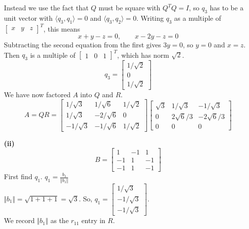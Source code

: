 \documentclass[11pt]{article}
\begin{document}
\noindent Instead we use the fact that $Q$ must be square with $Q^TQ = I$, so $q_3$ has to be a unit vector with $\langle q_3,q_1\rangle = 0$ and $\langle q_3,q_2\rangle = 0$. Writing $q_3$ as a multiple of $\begin{bmatrix} x&y&z \end{bmatrix}^T$, this means
$$
x+y-z=0, \qquad x-2y-z=0
$$
Subtracting the second equation from the first gives $3y=0$, so $y=0$ and $x=z$. Then $q_3$ is a multiple of $\begin{bmatrix} 1&0&1 \end{bmatrix}^T$, which has norm $\sqrt2$.
$$
q_3 = \begin{bmatrix}
    1/\sqrt2\\0\\1/\sqrt2
\end{bmatrix}
$$
We have now factored $A$ into $Q$ and $R$.
$$
A=QR=\begin{bmatrix}
1/\sqrt3 &1/\sqrt6&1/\sqrt2\\
1/\sqrt3 & -2/\sqrt6 &0\\
-1/\sqrt3 & -1/\sqrt6 &1/\sqrt2
\end{bmatrix}
\begin{bmatrix}
    \sqrt3&1/\sqrt3&-1/\sqrt3\\
    0&2\sqrt6/3&-2\sqrt6/3\\
    0&0&0
\end{bmatrix}
$$
\bigskip

\noindent\textbf{(ii)}
$$
B=\begin{bmatrix}
    1&-1&1\\
    -1&1&-1\\
    -1&1&-1
\end{bmatrix}
$$
First find $q_1$. \quad $q_1 = \frac{b_1}{\Vert b_1 \Vert}$\\
$\Vert b_1 \Vert = \sqrt{1 + 1 + 1} = \sqrt3$. So, $q_1 = \begin{bmatrix}
    1/\sqrt3\\-1/\sqrt3\\-1/\sqrt3
\end{bmatrix}$.\\
We record $\Vert b_1 \Vert$ as the $r_{11}$ entry in $R$.\\
\medskip
\end{document}
